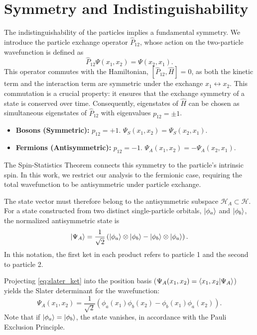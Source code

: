 \section{Symmetry and Indistinguishability} \label{sec:symmetry}

The indistinguishability of the particles implies a fundamental symmetry.
We introduce the particle exchange operator $\hat{P}_{12}$,
whose action on the two-particle wavefunction is defined as
\begin{equation}
	\hat{P}_{12}\Psi(x_1, x_2) = \Psi(x_2, x_1).
\end{equation}
This operator commutes with the Hamiltonian, $[\hat{P}_{12}, \hat{H}] = 0$,
as both the kinetic term and the interaction term are symmetric
under the exchange $x_1 \leftrightarrow x_2$.
This commutation is a crucial property: it ensures that the
exchange symmetry of a state is conserved over time.
Consequently, eigenstates of $\hat{H}$ can be chosen as simultaneous eigenstates
of $\hat{P}_{12}$ with eigenvalues $p_{12} = \pm 1$.
\begin{itemize}
	\item \textbf{Bosons (Symmetric):} $p_{12} = +1$.
		$\Psi_S(x_1, x_2) = \Psi_S(x_2, x_1)$.
	\item \textbf{Fermions (Antisymmetric):} $p_{12} = -1$.
		$\Psi_A(x_1, x_2) = -\Psi_A(x_2, x_1)$.
\end{itemize}
The Spin-Statistics Theorem connects this symmetry to the particle's
intrinsic spin. In this work, we restrict our analysis to the fermionic
case, requiring the total wavefunction to be antisymmetric under
particle exchange.

The state vector must therefore belong to the antisymmetric subspace
$\mathcal{H}_A \subset \mathcal{H}$.
For a state constructed from two distinct single-particle orbitals,
$\ket{\phi_a}$ and $\ket{\phi_b}$, the normalized antisymmetric state is
\begin{equation} \label{eq:slater_ket}
	\ket{\Psi_A} = \frac{1}{\sqrt{2}} \left( \ket{\phi_a} \otimes \ket{\phi_b}
	- \ket{\phi_b} \otimes \ket{\phi_a} \right).
\end{equation}
In this notation, the first ket in each product refers to particle 1
and the second to particle 2.

Projecting \cref{eq:slater_ket} into the position basis
($\Psi_A(x_1, x_2) = \braket{x_1, x_2 | \Psi_A}$) yields the
Slater determinant for the wavefunction:
\begin{equation}
	\Psi_A(x_1, x_2) = \frac{1}{\sqrt{2}} \left( \phi_a(x_1)\phi_b(x_2)
	- \phi_b(x_1)\phi_a(x_2) \right).
\end{equation}
Note that if $\ket{\phi_a} = \ket{\phi_b}$, the state vanishes,
in accordance with the Pauli Exclusion Principle.
